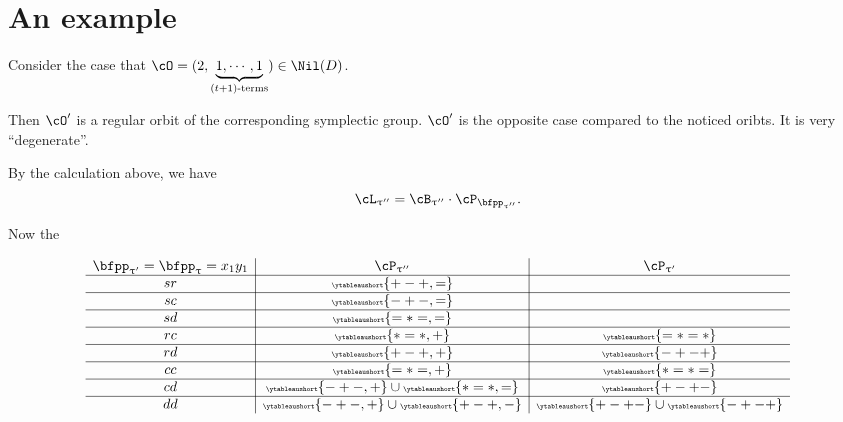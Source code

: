 \documentclass[12pt,a4paper]{amsart}
\numberwithin{equation}{section}
\theoremstyle{remark}
\let\ytb=\ytableaushort
\newcommand{\tytb}[1]{{\tiny\ytb{#1}}}
\def\cOp{\cO^{\prime}}
\def\uptaup{\uptau^{\prime}}
\def\uptaupp{\uptau^{\prime\prime}}
\begin{document}
\section{An example}\label{sec:C.reg}
Consider the case that
$\cO = (2,\underbrace{1, \cdots, 1}_{(t+1)\text{-terms}})\in \Nil(D)$.

Then $\cOp$ is a regular orbit of the corresponding symplectic group. $\cOp$ is
the opposite case compared to the noticed oribts. It is very ``degenerate''.

By the calculation above, we have
\[
  \cL_{\uptaupp} = \cB_{\uptaupp} \cdot \cP_{\bfpp_{\uptaupp}}.
\]

Now the


\begin{equation} \label{eq:B1-2}
  \begin{array}{c|c|c}
   \bfpp_{\uptaup}=\bfpp_{\uptau}=x_{1}y_{1}  &   \cP_{\uptaupp} & \cP_{\uptaup}\\
    \hline
    sr & \tytb{+-+,=} & \\
    \hline
    sc & \tytb{-+-,=} & \\
    \hline
    sd & \tytb{=\ast=,=} &\\
    \hline
    rc & \tytb{\ast=\ast,+} & \tytb{=\ast=\ast}\\
    \hline
    rd & \tytb{+-+,+} & \tytb{-+-+}\\
    \hline
    cc & \tytb{=\ast=,+} &  \tytb{\ast=\ast=} \\
    \hline
    cd & \tytb{-+-,+} \cup \tytb{\ast=\ast,=} &\tytb{+-+-} \\
    \hline
    dd & \tytb{-+-,+}\cup\tytb{+-+,-} &\tytb{+-+-} \cup \tytb{-+-+}\\
  \end{array}
\end{equation}
\end{document}
